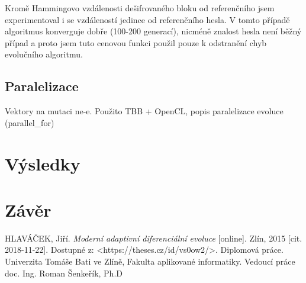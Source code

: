 \documentclass[11pt,a4paper]{scrartcl}
\begin{document}
	Kromě Hammingovo vzdálenosti dešifrovaného bloku od referenčního jsem experimentoval i se vzdáleností jedince od referenčního hesla. V tomto případě algoritmus konverguje dobře (100-200 generací), nicméně znalost hesla není běžný případ a proto jsem tuto cenovou funkci použil pouze k odstranění chyb evolučního algoritmu.
	\subsection{Paralelizace}
	Vektory na mutaci ne-e. Použito TBB + OpenCL, popis paralelizace evoluce (parallel\_for)
	
	\section{Výsledky}
	
	\section{Závěr}
	
	\begin{thebibliography}{9}
		HLAVÁČEK, Jiří. \textit{Moderní adaptivní diferenciální evoluce} [online]. Zlín, 2015 [cit. 2018-11-22]. Dostupné z: \textless https://theses.cz/id/vs0ow2/\textgreater. Diplomová práce. Univerzita Tomáše Bati ve Zlíně, Fakulta aplikované informatiky. Vedoucí práce doc. Ing. Roman Šenkeřík, Ph.D
	\end{thebibliography}
	
\end{document}
